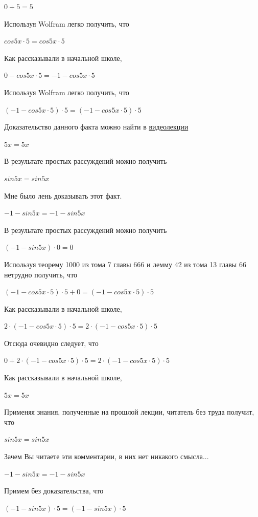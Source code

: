 \documentclass[12pt,a4paper,fleqn]{article}
\theoremstyle{definition}
\begin{document}
$ 0  +  5  =  5 $

Используя Wolfram легко получить, что 

$cos 5  x  \cdot  5  = cos 5  x  \cdot  5 $

Как рассказывали в начальной школе, 

$ 0  - cos 5  x  \cdot  5  =  -1  - cos 5  x  \cdot  5 $

Используя Wolfram легко получить, что 

$( -1  - cos 5  x  \cdot  5 ) \cdot  5  = ( -1  - cos 5  x  \cdot  5 ) \cdot  5 $

Доказательство данного факта можно найти в \href{https://www.youtube.com/watch?v=dQw4w9WgXcQ}{видеолекции} 

$ 5  x  =  5  x $

В результате простых рассуждений можно получить 

$sin 5  x  = sin 5  x $

Мне было лень доказывать этот факт.

$ -1  - sin 5  x  =  -1  - sin 5  x $

В результате простых рассуждений можно получить 

$( -1  - sin 5  x ) \cdot  0  =  0 $

Используя теорему 1000 из тома 7 главы 666 и лемму 42 из тома 13 главы 66 нетрудно получить, что 

$( -1  - cos 5  x  \cdot  5 ) \cdot  5  +  0  = ( -1  - cos 5  x  \cdot  5 ) \cdot  5 $

Как рассказывали в начальной школе, 

$ 2  \cdot ( -1  - cos 5  x  \cdot  5 ) \cdot  5  =  2  \cdot ( -1  - cos 5  x  \cdot  5 ) \cdot  5 $

Отсюда очевидно следует, что 

$ 0  +  2  \cdot ( -1  - cos 5  x  \cdot  5 ) \cdot  5  =  2  \cdot ( -1  - cos 5  x  \cdot  5 ) \cdot  5 $

Как рассказывали в начальной школе, 

$ 5  x  =  5  x $

Применяя знания, полученные на прошлой лекции, читатель без труда получит, что 

$sin 5  x  = sin 5  x $

Зачем Вы читаете эти комментарии, в них нет никакого смысла... 

$ -1  - sin 5  x  =  -1  - sin 5  x $

Примем без доказательства, что 

$( -1  - sin 5  x ) \cdot  5  = ( -1  - sin 5  x ) \cdot  5 $
\end{document}
